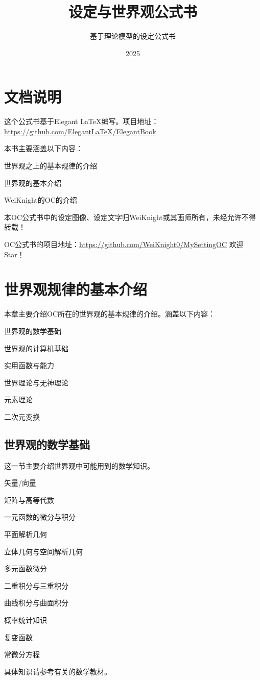 \documentclass[lang=cn,newtx,10pt,scheme=chinese]{elegantbook}
\title{\wkn{}设定与世界观公式书}
\subtitle{基于理论模型的设定公式书}
\author{\wkn{}}
\date{2025}
\newcommand{\wkn}{WeiKnight}
\begin{document}
\maketitle
\frontmatter

\tableofcontents

\mainmatter

\chapter*{文档说明}
这个公式书基于Elegant \LaTeX{}编写。项目地址：\href{https://github.com/ElegantLaTeX/ElegantBook}{https://github.com/ElegantLaTeX/ElegantBook}

本书主要涵盖以下内容：
\begin{introduction}
    \item 世界观之上的基本规律的介绍
    \item 世界观的基本介绍
    \item \wkn{}的OC的介绍
\end{introduction}

本OC公式书中的设定图像、设定文字归\wkn{}或其画师所有，未经允许不得转载！

OC公式书的项目地址：\href{https://github.com/WeiKnight0/MySettingOC}{https://github.com/WeiKnight0/MySettingOC} 欢迎Star！

\chapter{世界观规律的基本介绍}
本章主要介绍OC所在的世界观的基本规律的介绍。涵盖以下内容：
\begin{introduction}
    \item 世界观的数学基础
    \item 世界观的计算机基础
    \item 实用函数与能力
    \item 世界理论与无神理论
    \item 元素理论
    \item 二次元变换
\end{introduction}

\section{世界观的数学基础}
这一节主要介绍世界观中可能用到的数学知识。
\begin{introduction}
    \item 矢量/向量
    \item 矩阵与高等代数
    \item 一元函数的微分与积分
    \item 平面解析几何
    \item 立体几何与空间解析几何
    \item 多元函数微分
    \item 二重积分与三重积分
    \item 曲线积分与曲面积分
    \item 概率统计知识
    \item 复变函数
    \item 常微分方程
\end{introduction}
具体知识请参考有关的数学教材。
\end{document}
